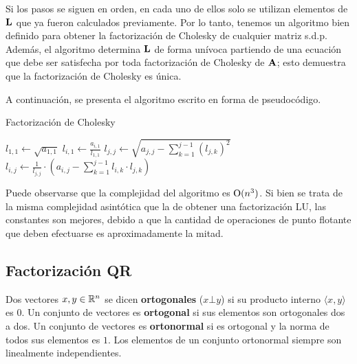 Si los pasos se siguen en orden, en cada uno de ellos solo se utilizan
elementos de $\mathbf{L}$ que ya fueron calculados previamente. Por lo tanto,
tenemos un algoritmo bien definido para obtener la factorización de Cholesky
de cualquier matriz s.d.p. Además, el algoritmo determina $\mathbf{L}$ de forma
unívoca partiendo de una ecuación que debe ser satisfecha por toda
factorización de Cholesky de $\mathbf{A}$; esto demuestra que la factorización
de Cholesky es única.

A continuación, se presenta el algoritmo escrito en forma de pseudocódigo.

\begin{algorithm}[H]
\caption{Factorización de Cholesky}
\label{algo:cholesky}


$\displaystyle l_{1,1} \gets \sqrt{a_{1,1}}$\;
 {
    $\displaystyle l_{i,1} \gets \frac{a_{i,1}}{l_{1,1}}$\;
}
 {
    $\displaystyle l_{j,j} \gets \sqrt{a_{j,j} -
        \sum_{k=1}^{j-1} (l_{j,k})^2}$\;
     {
        $\displaystyle l_{i,j} \gets \frac{1}{l_{j,j}} \cdot
        \left( a_{i,j} - \sum_{k=1}^{j-1} l_{i,k} \cdot l_{j,k} \right)$\;
    }
}
\end{algorithm}

Puede observarse que la complejidad del algoritmo es $\mathrm{O}(n^3)$. Si bien
se trata de la misma complejidad asintótica que la de obtener una
factorización LU, las constantes son mejores, debido a que la cantidad de
operaciones de punto flotante que deben efectuarse es aproximadamente la
mitad.


\subsection{Factorización QR}

Dos vectores $x, y \in \mathbb{R}^{n}$ se dicen \textbf{ortogonales} ($x \bot y$)
si su producto interno $\langle x,y \rangle$ es $0$. Un conjunto de vectores
es \textbf{ortogonal} si sus elementos son ortogonales dos a dos. Un conjunto
de vectores es \textbf{ortonormal} si es ortogonal y la norma de todos sus
elementos es $1$. Los elementos de un conjunto ortonormal siempre son
linealmente independientes.

